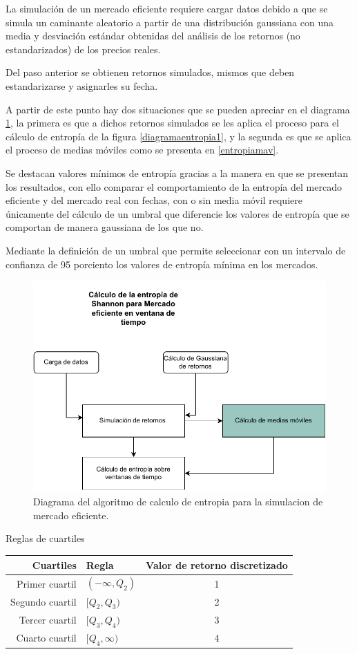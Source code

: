 La simulación de un mercado eficiente requiere cargar datos debido a que se simula un caminante aleatorio a partir de una distribución gaussiana con una media y desviación estándar obtenidas del análisis de los retornos (no estandarizados) de los precios reales. 

Del paso anterior se obtienen retornos simulados, mismos que deben estandarizarse y asignarles su fecha.

A partir de este punto hay dos situaciones que se pueden apreciar en el diagrama \ref{simulacion}, la primera es que a dichos retornos simulados se les aplica el proceso para el cálculo de entropía de la figura \ref{diagramaentropia1}, y la segunda es que se aplica el proceso de medias móviles como se presenta en \ref{entropiamav}.


Se destacan valores mínimos de entropía gracias a la manera en que se presentan los resultados, con ello comparar el comportamiento de la entropía del mercado eficiente y del mercado real con fechas, con o sin media móvil requiere únicamente del cálculo de un umbral que diferencie los valores de entropía que se comportan de manera gaussiana  de los que no.

Mediante la definición de un umbral que permite seleccionar con un intervalo de confianza de 95 porciento los valores de entropía mínima en los mercados. 

\begin{figure}
	\centering
	\includegraphics[width=0.9\linewidth]{figures/simulacion}
	\caption{Diagrama del algoritmo de calculo de entropia para la simulacion de mercado eficiente. }
	\label{simulacion}
\end{figure}

Reglas de cuartiles
\begin{center}
	\begin{tabular}{ |r | l | c| }
		 \hline
		Cuartiles & Regla & Valor de retorno discretizado \\ \hline
		Primer cuartil & $(-\infty , Q_2)$ & 1 \\
		Segundo cuartil & $[Q_2 , Q_3)$   & 2\\ 
		Tercer cuartil &  $[Q_3 , Q_4)$   & 3 \\
		Cuarto cuartil & $[Q_4 , \infty)$ &4\\ 
		 \hline
	\end{tabular}
\end{center}



